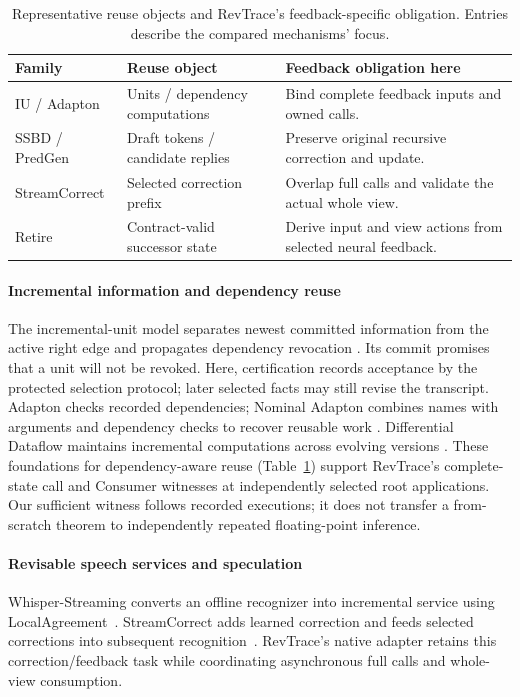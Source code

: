 \begin{table}[t]
\centering
\caption{Representative reuse objects and RevTrace's feedback-specific
obligation. Entries describe the compared mechanisms' focus.}
\label{tab:neighbor_objects}
\begingroup\small\setlength{\tabcolsep}{3pt}
\begin{tabular}{@{}>{\raggedright\arraybackslash}p{}>{\raggedright\arraybackslash}p{}>{\raggedright\arraybackslash}p{}@{}}
\toprule
Family & Reuse object & Feedback obligation here\\
\midrule
IU / Adapton & Units / dependency computations & Bind complete feedback
inputs and owned calls.\\
SSBD / PredGen & Draft tokens / candidate replies & Preserve original
recursive correction and update.\\
StreamCorrect & Selected correction prefix & Overlap full calls and
validate the actual whole view.\\
Retire & Contract-valid successor state & Derive input and view actions
from selected neural feedback.\\
\bottomrule
\end{tabular}\endgroup
\end{table}

\paragraph{Incremental information and dependency reuse}
The incremental-unit model separates newest committed information from
the active right edge and propagates dependency revocation
\cite{schlangen2011incremental}. Its commit promises that a unit will not
be revoked. Here, certification records acceptance by the protected
selection protocol; later selected facts may still revise the transcript.
Adapton checks recorded dependencies; Nominal Adapton combines names with
arguments and dependency checks to recover reusable work
\cite{hammer2014adapton,hammer2015names}. Differential Dataflow maintains
incremental computations across evolving versions
\cite{mcsherry2013differential}. These foundations for dependency-aware
reuse (Table~\ref{tab:neighbor_objects}) support RevTrace's complete-state
call and Consumer witnesses at independently selected root applications.
Our sufficient witness follows recorded executions; it does not transfer a
from-scratch theorem to independently repeated floating-point inference.

\paragraph{Revisable speech services and speculation}
Whisper-Streaming converts an offline recognizer into incremental service
using LocalAgreement~\cite{machacek2023whisperstreaming}. StreamCorrect
adds learned correction and feeds selected corrections into subsequent
recognition~\cite{vu2026streamcorrect}. RevTrace's native adapter retains
this correction/feedback task while coordinating asynchronous full calls
and whole-view consumption.

